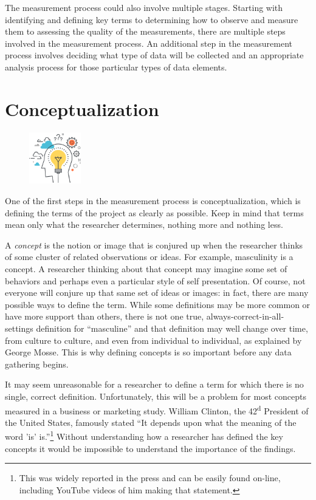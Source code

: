 The measurement process could also involve multiple stages. Starting with identifying and defining key terms to determining how to observe and measure them to assessing the quality of the measurements, there are multiple steps involved in the measurement process. An additional step in the measurement process involves deciding what type of data will be collected and an appropriate analysis process for those particular types of data elements. 

\section{Conceptualization}

\begin{figure}
	\caption*{} %
	\label{} 
	\centering
	\includegraphics[width=0.2\textwidth]{gfx/05-concept} 
\end{figure}

One of the first steps in the measurement process is conceptualization, which is defining the terms of the project as clearly as possible. Keep in mind that terms mean only what the researcher determines, nothing more and nothing less.

A \textit{concept} is the notion or image that is conjured up when the researcher thinks of some cluster of related observations or ideas. For example, masculinity is a concept. A researcher thinking about that concept may imagine some set of behaviors and perhaps even a particular style of self presentation. Of course, not everyone will conjure up that same set of ideas or images: in fact, there are many possible ways to define the term. While some definitions may be more common or have more support than others, there is not one true, always-correct-in-all-settings definition for ``masculine'' and that definition may well change over time, from culture to culture, and even from individual to individual, as explained by George Mosse\cite{george1996image}. This is why defining concepts is so important before any data gathering begins.

It may seem unreasonable for a researcher to define a term for which there is no single, correct definition. Unfortunately, this will be a problem for most concepts measured in a business or marketing study. William Clinton, the 42\textsuperscript{d} President of the United States, famously stated ``It depends upon what the meaning of the word 'is' is.''\footnote{This was widely reported in the press and can be easily found on-line, including YouTube videos of him making that statement.} Without understanding how a researcher has defined the key concepts it would be impossible to understand the importance of the findings.

